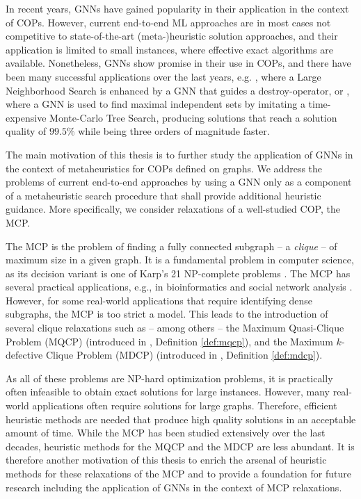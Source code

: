 \documentclass[draft,final]{vutinfth} %
\begin{document}
In recent years, GNNs have gained popularity in their application in the context of COPs. However, current end-to-end ML approaches are in most cases not competitive to state-of-the-art (meta-)heuristic solution approaches, and their application is limited to small instances, where effective exact algorithms are available. Nonetheless, GNNs show promise in their use in COPs, and there have been many successful applications over the last years, e.g. 
\cite{Oberweger2022}, where a Large Neighborhood Search is enhanced by a GNN that guides a destroy-operator, or \cite{NEURIPS2021_0db2e204}, where a GNN is used to find maximal independent sets by imitating a time-expensive Monte-Carlo Tree Search, producing solutions that reach a solution quality of $99.5\%$ while being three orders of magnitude faster. 

The main motivation of this thesis is to further study the application of GNNs in the context of metaheuristics for COPs defined on graphs. We address the problems of current end-to-end approaches by using a GNN only as a component of a metaheuristic search procedure that shall provide additional heuristic guidance. More specifically, we consider relaxations of a well-studied COP, the MCP. 

The MCP is the problem of finding a fully connected subgraph -- a \textit{clique} -- of maximum size in a given graph. It is a fundamental problem in computer science, as its decision variant is one of Karp's 21 NP-complete problems \cite{Karp1972}. The MCP has several practical applications, e.g.,  in bioinformatics \cite{Dognin2010} and social network analysis \cite{Pattillo_network_analysis_2013}. However, for some real-world applications that require identifying dense subgraphs, the MCP is too strict a model. This leads to the introduction of several clique relaxations such as -- among others -- the Maximum Quasi-Clique Problem (MQCP) (introduced in \cite{Abello2002}, Definition \ref{def:mqcp}), and the Maximum $k$-defective Clique Problem (MDCP) (introduced in \cite{Yu2006}, Definition \ref{def:mdcp}). 

As all of these problems are NP-hard optimization problems, it is practically often infeasible to obtain exact solutions for large instances. However, many real-world applications often require solutions for large graphs. Therefore, efficient heuristic methods are needed that produce high quality solutions in an acceptable amount of time. While the MCP has been studied extensively over the last decades, heuristic methods for the MQCP and the MDCP are less abundant. It is therefore another motivation of this thesis to enrich the arsenal of heuristic methods for these relaxations of the MCP and to provide a foundation for future research including the application of GNNs in the context of MCP relaxations. 
\end{document}
